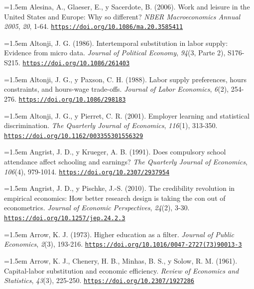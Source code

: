 \documentclass[10pt,a4paper]{article}
\begin{document}
\noindent\hangindent=1.5em Alesina, A., Glaeser, E., y Sacerdote, B. (2006). Work and leisure in the United States and Europe: Why so different? \textit{NBER Macroeconomics Annual 2005}, \textit{20}, 1-64. \href{https://doi.org/10.1086/ma.20.3585411}{\nolinkurl{https://doi.org/10.1086/ma.20.3585411}}

\noindent\hangindent=1.5em Altonji, J. G. (1986). Intertemporal substitution in labor supply: Evidence from micro data. \textit{Journal of Political Economy}, \textit{94}(3, Parte 2), S176-S215. \href{https://doi.org/10.1086/261403}{\nolinkurl{https://doi.org/10.1086/261403}}

\noindent\hangindent=1.5em Altonji, J. G., y Paxson, C. H. (1988). Labor supply preferences, hours constraints, and hours-wage trade-offs. \textit{Journal of Labor Economics}, \textit{6}(2), 254-276. \href{https://doi.org/10.1086/298183}{\nolinkurl{https://doi.org/10.1086/298183}}

\noindent\hangindent=1.5em Altonji, J. G., y Pierret, C. R. (2001). Employer learning and statistical discrimination. \textit{The Quarterly Journal of Economics}, \textit{116}(1), 313-350. \href{https://doi.org/10.1162/003355301556329}{\nolinkurl{https://doi.org/10.1162/003355301556329}}

\noindent\hangindent=1.5em Angrist, J. D., y Krueger, A. B. (1991). Does compulsory school attendance affect schooling and earnings? \textit{The Quarterly Journal of Economics}, \textit{106}(4), 979-1014. \href{https://doi.org/10.2307/2937954}{\nolinkurl{https://doi.org/10.2307/2937954}}

\noindent\hangindent=1.5em Angrist, J. D., y Pischke, J.-S. (2010). The credibility revolution in empirical economics: How better research design is taking the con out of econometrics. \textit{Journal of Economic Perspectives}, \textit{24}(2), 3-30. \href{https://doi.org/10.1257/jep.24.2.3}{\nolinkurl{https://doi.org/10.1257/jep.24.2.3}}

\noindent\hangindent=1.5em Arrow, K. J. (1973). Higher education as a filter. \textit{Journal of Public Economics}, \textit{2}(3), 193-216. \href{https://doi.org/10.1016/0047-2727(73)90013-3}{\nolinkurl{https://doi.org/10.1016/0047-2727(73)90013-3}}

\noindent\hangindent=1.5em Arrow, K. J., Chenery, H. B., Minhas, B. S., y Solow, R. M. (1961). Capital-labor substitution and economic efficiency. \textit{Review of Economics and Statistics}, \textit{43}(3), 225-250. \href{https://doi.org/10.2307/1927286}{\nolinkurl{https://doi.org/10.2307/1927286}}
\end{document}
